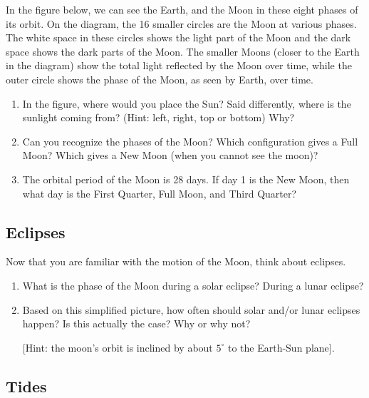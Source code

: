 \documentclass[12pt]{article}%
\begin{document}
In the figure below, we can see the Earth, and the Moon in these eight phases of its orbit. On the diagram, the 16 smaller circles are the Moon at various phases. The white space in these circles shows the light part of the Moon and the dark space shows the dark parts of the Moon. The smaller Moons (closer to the Earth in the diagram) show the total light reflected by the Moon over time, while the outer circle shows the phase of the Moon, as seen by Earth, over time. 




\begin{enumerate}
\item In the figure, where would you place the Sun? Said differently, where is the sunlight coming from? (Hint: left, right, top or bottom) Why?

\item Can you recognize the phases of the Moon? Which configuration gives a Full Moon? Which gives a New Moon (when you cannot see the moon)? 

\item The orbital period of the Moon is 28 days. If day 1 is the New Moon, then what day is the First Quarter, Full Moon, and Third Quarter?

\end{enumerate}

\vspace{10cm}

\subsection{Eclipses}
Now that you are familiar with the motion of the Moon, think about eclipses.
\begin{enumerate}

    \item What is the phase of the Moon during a solar eclipse? During a lunar eclipse?
    
    \item Based on this simplified picture, how often should solar and/or lunar eclipses happen? Is this actually the case? Why or why not?
    
    [Hint: the moon's orbit is inclined by about $5^{\circ}$ to the Earth-Sun plane].
    
    

    
\end{enumerate}


\pagebreak
\subsection{Tides}
\end{document}
